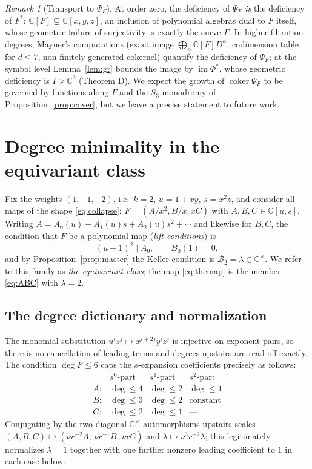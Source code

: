 \documentclass[11pt]{amsart}
\newcommand{\CC}{\mathbb{C}}
\newcommand{\Cstar}{\CC^{\times}}
\newcommand{\im}{\operatorname{im}}
\newcommand{\brk}{\mathcal{B}}
\theoremstyle{plain}
\theoremstyle{definition}
\theoremstyle{remark}
\newtheorem{remark}[theorem]{Remark}
\begin{document}
\begin{remark}[Transport to $\Psi_{F}$]\label{rem:transport}
At order zero, the deficiency of $\Psi_{F}$ \emph{is} the deficiency of
$F^{*}$: $\CC[F]\subsetneq\CC[x,y,z]$, an inclusion of polynomial algebras
dual to $F$ itself, whose geometric failure of surjectivity is exactly the
curve $\Gamma$. In higher filtration degrees, Mayner's computations
\cite{Mayner26} (exact image
$\bigoplus_{\alpha}\CC[F]D^{\alpha}$, codimension table for $d\le7$,
non-finitely-generated cokernel) quantify the deficiency of $\Psi_{F}$; at
the symbol level Lemma~\ref{lem:gr} bounds the image by
$\im\Phi^{*}$, whose geometric deficiency is $\Gamma\times\CC^{3}$
(Theorem D). We expect the growth of $\operatorname{coker}\Psi_{F}$ to be
governed by functions along $\Gamma$ and the $S_{3}$ monodromy of
Proposition~\ref{prop:cover}, but we leave a precise statement to future
work.
\end{remark}

\section{Degree minimality in the equivariant class}\label{sec:min}

Fix the weights $(1,-1,-2)$, i.e.\ $k=2$, $u=1+xy$, $s=x^{2}z$, and
consider all maps of the shape \eqref{eq:collapse}:
$F=(A/x^{2},B/x,xC)$ with $A,B,C\in\CC[u,s]$. Writing
$A=A_{0}(u)+A_{1}(u)s+A_{2}(u)s^{2}+\cdots$ and likewise for $B,C$, the
condition that $F$ be a polynomial map (\emph{lift conditions}) is
\[
(u-1)^{2}\mid A_{0},\qquad B_{0}(1)=0,
\]
and by Proposition~\ref{prop:master} the Keller condition is
$\brk_{2}=\lambda\in\Cstar$. We refer to this family as \emph{the
equivariant class}; the map \eqref{eq:themap} is the member
\eqref{eq:ABC} with $\lambda=2$.

\subsection{The degree dictionary and normalization}
The monomial substitution $u^{i}s^{j}\mapsto x^{i+2j}y^{i}z^{j}$ is
injective on exponent pairs, so there is no cancellation of leading terms
and degrees upstairs are read off exactly. The condition $\deg F\le6$
caps the $s$-expansion coefficients precisely as follows:
\[
\begin{array}{l|ccc}
 & s^{0}\text{-part} & s^{1}\text{-part} & s^{2}\text{-part}\\\hline
A: & \deg\le4 & \deg\le2 & \deg\le1\\
B: & \deg\le3 & \deg\le2 & \text{constant}\\
C: & \deg\le2 & \deg\le1 & \text{---}
\end{array}
\]
Conjugating by the two diagonal $\Cstar$-automorphisms upstairs scales
$(A,B,C)\mapsto(\nu r^{-2}A,\,\nu r^{-1}B,\,\nu rC)$ and
$\lambda\mapsto\nu^{3}r^{-2}\lambda$; this legitimately normalizes
$\lambda=1$ together with one further nonzero leading coefficient to $1$
in each case below.
\end{document}

